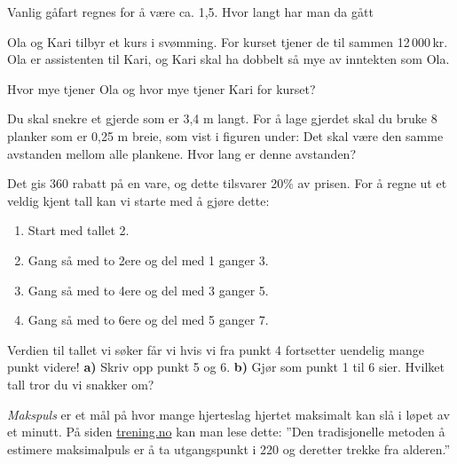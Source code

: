 



\opgt
\nes
{}
Vanlig gåfart regnes for å være ca. 1,5. Hvor langt har man da gått

Ola og Kari tilbyr et kurs i svømming. For kurset tjener de til sammen 12\,000\,kr. Ola er assistenten til Kari, og Kari skal ha dobbelt så mye av inntekten som Ola. \os

Hvor mye tjener Ola og hvor mye tjener Kari for kurset?

Du skal snekre et gjerde som er 3,4 m langt. For å lage gjerdet skal du bruke 8 planker som er 0,25 m breie, som vist i figuren under:
Det skal være den samme avstanden mellom alle plankene. Hvor lang er denne avstanden?

 \vs
{}

Det gis 360 rabatt på en vare, og dette tilsvarer 20\% av prisen.
 For å regne ut et veldig kjent tall kan vi starte med å gjøre dette: \os
\begin{enumerate}
	\item Start med tallet 2.
	\item Gang så med to 2ere og del med 1 ganger 3.
	\item Gang så med to 4ere og del med 3 ganger 5.
	\item Gang så med to 6ere og del med 5 ganger 7.
\end{enumerate}
Verdien til tallet vi søker får vi hvis vi fra punkt 4 fortsetter uendelig mange punkt videre!\os
\textbf{a)} Skriv opp punkt 5 og 6. \os
\textbf{b)} Gjør som punkt 1 til 6 sier. Hvilket tall tror du vi snakker om?

\textit{Makspuls} er et mål på hvor mange hjerteslag hjertet maksimalt kan slå i løpet av et minutt. På siden \href{http://www.trening.no/utholdenhet/ny-formel-for-beregning-av-makspuls/}{\color{blue}trening.no} kan man lese dette:\os
''Den tradisjonelle metoden å estimere maksimalpuls er å ta utgangspunkt i 220 og deretter trekke fra alderen.''\os

